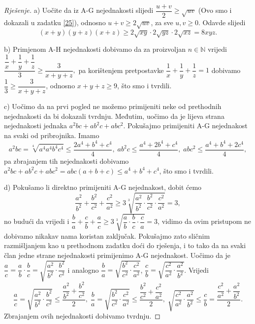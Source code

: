\begin{proof}[Rješenje]
a) Uočite da iz A-G nejednakosti slijedi $\dfrac{u+v}{2}\geq \sqrt{uv}$ (Ovo smo i dokazali u zadatku \ref{25}), odnosno $u+v\geq 2\sqrt{uv}$, za sve $u, v\geq 0$. Odavde slijedi
$$(x+y)(y+z)(x+z)\geq 2\sqrt{xy}\cdot 2\sqrt{yz}\cdot 2\sqrt{xz}=8xyz.$$

b) Primjenom A-H nejednakosti dobivamo da za proizvoljan $n\in \mathbb{N}$ vrijedi
$\dfrac{\dfrac{1}{x}+\dfrac{1}{y}+\dfrac{1}{z}}{3}\geq \dfrac{3}{x+y+z},$
pa korištenjem pretpostavke $\dfrac{1}{x}+\dfrac{1}{y}+\dfrac{1}{z}=1$ dobivamo $\dfrac{1}{3}\geq\dfrac{3}{x+y+z}$, odnosno $x+y+z\geq 9$, što smo i tvrdili.

c) Uočimo da na prvi pogled ne možemo primijeniti neke od prethodnih nejednakosti da bi dokazali tvrdnju. Međutim, uočimo da je lijeva strana nejednakosti jednaka $a^2bc+ab^2c+abc^2$. Pokušajmo primijeniti A-G nejednakost na svaki od pribrojnika. Imamo
$$a^2bc=\sqrt[4]{a^4a^4b^4c^4}\leq \dfrac{2a^4+b^4+c^4}{4},\;ab^2c\leq \dfrac{a^4+2b^4+c^4}{4},\;abc^2\leq \dfrac{a^4+b^4+2c^4}{4},$$
pa zbrajanjem tih nejednakosti dobivamo $a^2bc+ab^2c+abc^2=abc(a+b+c)\leq a^4+b^4+c^4$, što smo i tvrdili.

d) Pokušamo li direktno primijeniti A-G nejednakost, dobit ćemo
$$\dfrac{a^2}{b^2}+\dfrac{b^2}{c^2}+\dfrac{c^2}{a^2}\geq 3\sqrt[3]{\dfrac{a^2}{b^2}\cdot \dfrac{b^2}{c^2}\cdot \dfrac{c^2}{a^2}}=3,$$
no budući da vrijedi i $\dfrac{b}{a}+\dfrac{c}{b}+\dfrac{a}{c}\geq 3\sqrt[3]{\dfrac{a}{b}\cdot \dfrac{b}{c}\cdot \dfrac{c}{a}}=3$, vidimo da ovim pristupom ne dobivamo nikakav nama koristan zaključak. Pokušajmo zato sličnim razmišljanjem kao u prethodnom zadatku doći do rješenja, i to tako da na svaki član jedne strane nejednakosti primijenimo A-G nejednakost. Uočimo da je $\dfrac{a}{c}=\dfrac{a}{b}\cdot \dfrac{b}{c}=\sqrt{\dfrac{a^2}{b^2}\cdot\dfrac{b^2}{c^2}}$ i analogno $\dfrac{b}{a}=\sqrt{\dfrac{b^2}{c^2}\cdot\dfrac{c^2}{a^2}}$, $\dfrac{c}{b}=\sqrt{\dfrac{c^2}{a^2}\cdot\dfrac{a^2}{b^2}}$. Vrijedi
$$\dfrac{a}{c}=\sqrt{\dfrac{a^2}{b^2}\cdot\dfrac{b^2}{c^2}}\leq \dfrac{\dfrac{a^2}{b^2}+\dfrac{b^2}{c^2}}{2},\; \dfrac{b}{a}=\sqrt{\dfrac{b^2}{c^2}\cdot\dfrac{c^2}{a^2}}\leq \dfrac{\dfrac{b^2}{c^2}+\dfrac{c^2}{a^2}}{2},\; \sqrt{\dfrac{c^2}{a^2}\cdot\dfrac{a^2}{b^2}}\leq \dfrac{c}{b}=\dfrac{\dfrac{c^2}{a^2}+\dfrac{a^2}{b^2}}{2}.$$
Zbrajanjem ovih nejednakosti dobivamo tvrdnju.


\end{proof}
